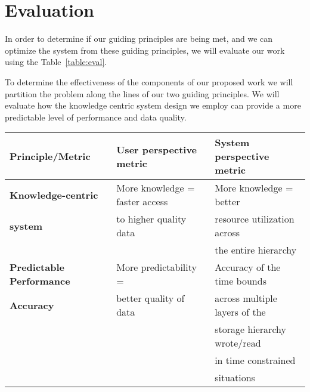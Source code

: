 \section{Evaluation}
\label{sec:evaluation}

In order to determine if our guiding principles are being met, and we can
optimize the system from these guiding principles, we will evaluate our work
using the Table~\ref{table:eval}.

To determine the effectiveness of the components of our proposed work we will
partition the problem along the lines of our two guiding principles. 
We will evaluate how the knowledge centric system design we employ can
provide a more predictable level of performance and data quality. 


\begin{tabular}{ | l | l | l | }

  \hline
  {\bf Principle/Metric}                   & {\bf User perspective metric}   & {\bf System perspective metric }\\ \hline
  {\bf Knowledge-centric}                  & More knowledge = faster access  &  More knowledge = better \\
  {\bf system}                             & to higher quality data          &  resource utilization across \\
                                           &                                 & the entire hierarchy \\ \hline
                                                                                                                                        
                                                                                                                                         
                                                                                                                                             
  {\bf Predictable Performance} & More predictability =                     &  Accuracy of the time bounds \\
  {\bf Accuracy}                & better quality of data                    &  across multiple layers of the\\
                                           &                                           &  storage hierarchy wrote/read \\ 
                                           &                                           &  in time constrained\\
                                           &                                           &  situations \\ \hline
                                                                                                                                         
                                                                                                                                            
\end{tabular}


